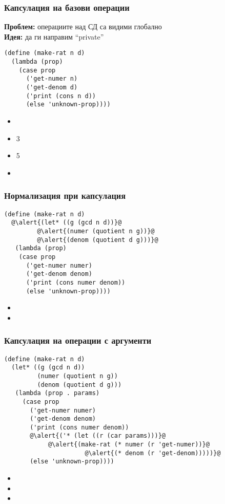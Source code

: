 \documentclass[alsotrans]{beamerswitch}
\begin{document}
\begin{frame}[fragile]
  \frametitle{Капсулация на базови операции}

  \textbf{Проблем:} операциите над СД са видими глобално\\[2ex]
  \pause
  \textbf{Идея:} да ги направим ``private''
  \pause
\begin{lstlisting}
(define (make-rat n d)
  (lambda (prop)
    (case prop
      ('get-numer n)
      ('get-denom d)
      ('print (cons n d))
      (else 'unknown-prop))))
\end{lstlisting}
  \pause
  \begin{itemize}
  \item {}
  \item {}3
  \item {}5
  \item {}
  \end{itemize}
\end{frame}

\begin{frame}[fragile]
  \frametitle{Нормализация при капсулация}

\begin{lstlisting}
(define (make-rat n d)
  @\alert{(let* ((g (gcd n d))}@
         @\alert{(numer (quotient n g))}@
         @\alert{(denom (quotient d g)))}@
   (lambda (prop)
    (case prop
      ('get-numer numer)
      ('get-denom denom)
      ('print (cons numer denom))
      (else 'unknown-prop))))
\end{lstlisting}
  \pause
  \begin{itemize}
  \item {}
  \item {}
  \end{itemize}
\end{frame}

\begin{frame}[fragile]
  \frametitle{Капсулация на операции с аргументи}

  \lstsize\footnotesize
\begin{lstlisting}
(define (make-rat n d)
  (let* ((g (gcd n d))
         (numer (quotient n g))
         (denom (quotient d g)))
   (lambda (prop . params)
     (case prop
       ('get-numer numer)
       ('get-denom denom)
       ('print (cons numer denom))
       @\alert{('* (let ((r (car params)))}@
            @\alert{(make-rat (* numer (r 'get-numer))}@
                      @\alert{(* denom (r 'get-denom)))))}@
       (else 'unknown-prop))))
\end{lstlisting}
  \pause
  \begin{itemize}
  \item {}
  \item {}
  \item {}
  \end{itemize}
\end{frame}
\end{document}
